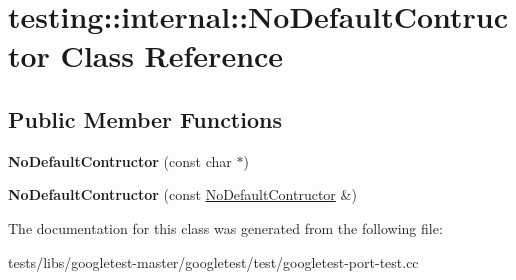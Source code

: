 \hypertarget{classtesting_1_1internal_1_1NoDefaultContructor}{}\section{testing\+:\+:internal\+:\+:No\+Default\+Contructor Class Reference}
\label{classtesting_1_1internal_1_1NoDefaultContructor}
\subsection*{Public Member Functions}
\begin{DoxyCompactItemize}
\item 
\mbox{\label{classtesting_1_1internal_1_1NoDefaultContructor_a34c9cdf833476a9718141dcff931ba42}} 
{\bfseries No\+Default\+Contructor} (const char $\ast$)
\item 
\mbox{\label{classtesting_1_1internal_1_1NoDefaultContructor_acba74b55a8c5341808ecb5b9318eaecf}} 
{\bfseries No\+Default\+Contructor} (const \hyperlink{classtesting_1_1internal_1_1NoDefaultContructor}{No\+Default\+Contructor} \&)
\end{DoxyCompactItemize}


The documentation for this class was generated from the following file\+:\begin{DoxyCompactItemize}
\item 
tests/libs/googletest-\/master/googletest/test/googletest-\/port-\/test.\+cc\end{DoxyCompactItemize}

